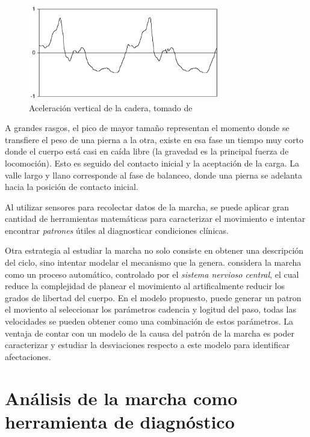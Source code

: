 \begin{figure}
    \centering
    \includegraphics[width = 0.75\textwidth]{imagenes/menz_acceleration}
    \caption{Aceleración vertical de la cadera, tomado de \citep{menz}}
    \label{fig:menz_acc_ver}
\end{figure}

A grandes rasgos, el pico de mayor tamaño representan el momento donde se transfiere el peso de una pierna a la otra, existe en esa fase un tiempo muy corto donde el cuerpo está casi en caída libre (la gravedad es la principal fuerza de locomoción). Esto es seguido del contacto inicial y la aceptación de la carga. La valle largo y llano corresponde al fase de balanceo, donde una pierna se adelanta hacia la posición de contacto inicial.

Al utilizar sensores para recolectar datos de la marcha, se puede aplicar gran cantidad de herramientas matemáticas para caracterizar el movimiento e intentar encontrar \emph{patrones} útiles al diagnosticar condiciones clínicas. 

Otra estrategia al estudiar la marcha no solo consiste en obtener una descripción del ciclo, sino intentar modelar el mecanismo que la genera. \cite{dejnabadi} considera la marcha como un proceso automático, controlado por el \emph{sistema nervioso central}, el cual reduce la complejidad de planear el movimiento al artificalmente reducir los grados de libertad del cuerpo. En el modelo propuesto, puede generar un patron el moviento al seleccionar los parámetros cadencia y logitud del paso, todas las velocidades se pueden obtener como una combinación de estos parámetros. La ventaja de contar con un modelo de la causa del patrón de la marcha es poder caracterizar y estudiar la desviaciones respecto a este modelo para identificar afectaciones. 



\section[Herramienta de diagnóstico]{Análisis de la marcha como herramienta de diagnóstico}

